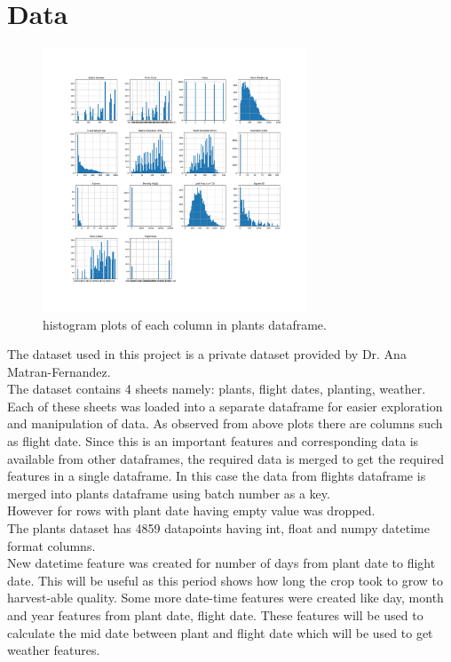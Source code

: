 \documentclass{article}
\begin{document}
\section{Data}
\begin{figure}[tb]
\centering
\includegraphics[width=0.7\textwidth]{plants_hist.pdf}
\caption{\label{fig:plants_hist}histogram plots of each column in plants dataframe.}
\end{figure}
The dataset used in this project is a private dataset provided by Dr. Ana Matran-Fernandez.\\
The dataset contains 4 sheets namely: plants, flight dates, planting, weather. Each of these sheets was loaded into a separate dataframe for easier exploration and manipulation of data.
As observed from above plots there are columns such as flight date. Since this is an important features and corresponding data is available from other dataframes, the required data is merged to get the required features in a single dataframe. In this case the data from flights dataframe is merged into plants dataframe using batch number as a key.\\
However for rows with plant date having empty value was dropped.\\
The plants dataset has 4859 datapoints having int, float and numpy datetime format columns.\\
New datetime feature was created for number of days from plant date to flight date. This will be useful as this period shows how long the crop took to grow to harvest-able quality. Some more date-time features were created like day, month and year features from plant date, flight date. These features will be used to calculate the mid date between plant and flight date which will be used to get weather features.\\
\end{document}
